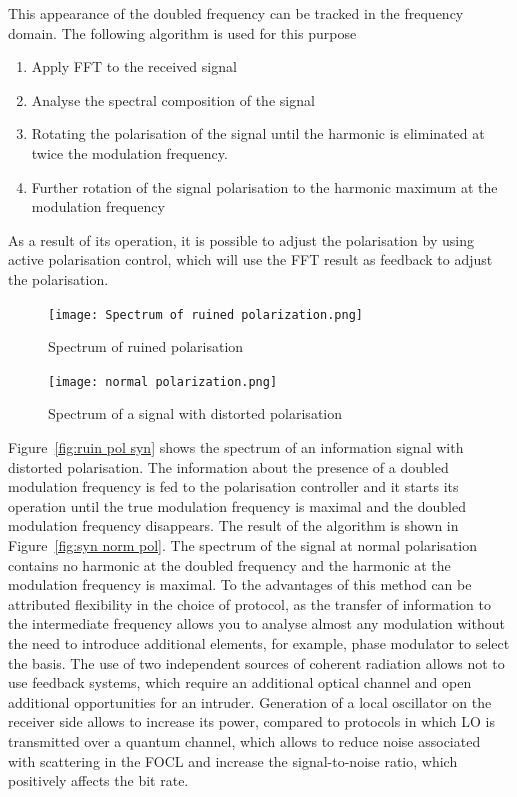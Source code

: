 {This appearance of the doubled frequency can be tracked in the frequency domain. The following algorithm is used for this purpose 
\begin{enumerate}
    \item Apply FFT to the received signal
    \item Analyse the spectral composition of the signal
    \item Rotating the polarisation of the signal until the harmonic is eliminated at twice the modulation frequency.
    \item Further rotation of the signal polarisation to the harmonic maximum at the modulation frequency
\end{enumerate}
As a result of its operation, it is possible to adjust the polarisation by using active polarisation control, which will use the FFT result as feedback to adjust the polarisation. 
\begin{figure}
    \centering
    \texttt{[image: Spectrum of ruined polarization.png]}
    \caption{Spectrum of ruined polarisation}
    \label{fig:ruined pol syn}
\end{figure}
\begin{figure}
    \centering
    \texttt{[image: normal polarization.png]}
    \caption{Spectrum of a signal with distorted polarisation}
    \label{fig:norm pol syn}
\end{figure}
Figure~\ref{fig:ruin pol syn} shows the spectrum of an information signal with distorted polarisation. The information about the presence of a doubled modulation frequency is fed to the polarisation controller and it starts its operation until the true modulation frequency is maximal and the doubled modulation frequency disappears. The result of the algorithm is shown in Figure~\ref{fig:syn norm pol}. The spectrum of the signal at normal polarisation contains no harmonic at the doubled frequency and the harmonic at the modulation frequency is maximal.
\newline To the advantages of this method can be attributed flexibility in the choice of protocol, as the transfer of information to the intermediate frequency allows you to analyse almost any modulation without the need to introduce additional elements, for example, phase modulator to select the basis. The use of two independent sources of coherent radiation allows not to use feedback systems, which require an additional optical channel and open additional opportunities for an intruder. Generation of a local oscillator on the receiver side allows to increase its power, compared to protocols in which LO is transmitted over a quantum channel, which allows to reduce noise associated with scattering in the FOCL and increase the signal-to-noise ratio, which positively affects the bit rate.
}
